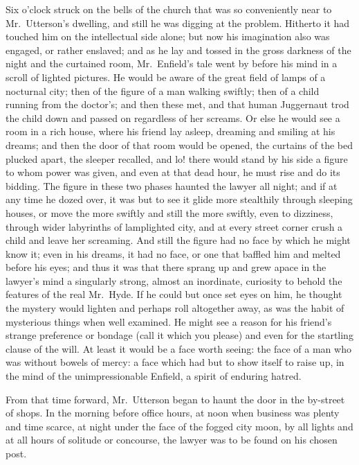 \documentclass[12pt,openright]{book}
\begin{document}
Six o’clock struck on the bells of the church that was so conveniently near to Mr. Utterson’s dwelling, and still he was digging at the problem. Hitherto it had touched him on the intellectual side alone; but now his imagination also was engaged, or rather enslaved; and as he lay and tossed in the gross darkness of the night and the curtained room, Mr. Enfield’s tale went by before his mind in a scroll of lighted pictures. He would be aware of the great field of lamps of a nocturnal city; then of the figure of a man walking swiftly; then of a child running from the doctor’s; and then these met, and that human Juggernaut trod the child down and passed on regardless of her screams. Or else he would see a room in a rich house, where his friend lay asleep, dreaming and smiling at his dreams; and then the door of that room would be opened, the curtains of the bed plucked apart, the sleeper recalled, and lo! there would stand by his side a figure to whom power was given, and even at that dead hour, he must rise and do its bidding. The figure in these two phases haunted the lawyer all night; and if at any time he dozed over, it was but to see it glide more stealthily through sleeping houses, or move the more swiftly and still the more swiftly, even to dizziness, through wider labyrinths of lamplighted city, and at every street corner crush a child and leave her screaming. And still the figure had no face by which he might know it; even in his dreams, it had no face, or one that baffled him and melted before his eyes; and thus it was that there sprang up and grew apace in the lawyer’s mind a singularly strong, almost an inordinate, curiosity to behold the features of the real Mr. Hyde. If he could but once set eyes on him, he thought the mystery would lighten and perhaps roll altogether away, as was the habit of mysterious things when well examined. He might see a reason for his friend’s strange preference or bondage (call it which you please) and even for the startling clause of the will. At least it would be a face worth seeing: the face of a man who was without bowels of mercy: a face which had but to show itself to raise up, in the mind of the unimpressionable Enfield, a spirit of enduring hatred.

From that time forward, Mr. Utterson began to haunt the door in the by-street of shops. In the morning before office hours, at noon when business was plenty and time scarce, at night under the face of the fogged city moon, by all lights and at all hours of solitude or concourse, the lawyer was to be found on his chosen post.
\end{document}
